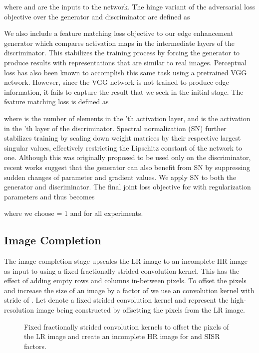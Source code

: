 \documentclass[10pt,twocolumn,letterpaper]{article}
\begin{document}
where  and  are the inputs to the network. The hinge variant \cite{miyato2018spectral} of the adversarial loss objective over the generator and discriminator are defined as


We also include a feature matching loss objective  \cite{wang2018high} to our edge enhancement generator which compares activation maps in the intermediate layers of the discriminator. This stabilizes the training process by forcing the generator to produce results with representations that are similar to real images. Perceptual loss \cite{johnson2016perceptual,gatys2016image,gatys2015texture} has also been known to accomplish this same task using a pretrained VGG network. However, since the VGG network is not trained to produce edge information, it fails to capture the result that we seek in the initial stage. The feature matching loss is defined as


where  is the number of elements in the 'th activation layer, and  is the activation in the 'th layer of the discriminator. Spectral normalization (SN) \cite{miyato2018spectral} further stabilizes training by scaling down weight matrices by their respective largest singular values, effectively restricting the Lipschitz constant of the network to one. Although this was originally proposed to be used only on the discriminator, recent works \cite{zhang2018self, odena2018generator} suggest that the generator can also benefit from SN by suppressing sudden changes of parameter and gradient values. We apply SN to both the generator and discriminator. The final joint loss objective for  with regularization parameters  and  thus becomes

where we choose  = 1 and  for all experiments. 

\subsection{Image Completion}
The image completion stage upscales the LR image to an incomplete HR image as input to  using a fixed fractionally strided convolution kernel. This has the effect of adding empty rows and columns in-between pixels. To offset the pixels and increase the size of an image by a factor of  we use an  convolution kernel with stride of . Let  denote a fixed strided convolution kernel and  represent the high-resolution image being constructed by offsetting the pixels from the LR image. 

\begin{figure}[h]
	
	\caption{Fixed fractionally strided convolution kernels to offset the pixels of the LR image and create an incomplete HR image for  and  SISR factors.}
	\label{fig:sr_kernels}
\end{figure}
\end{document}
